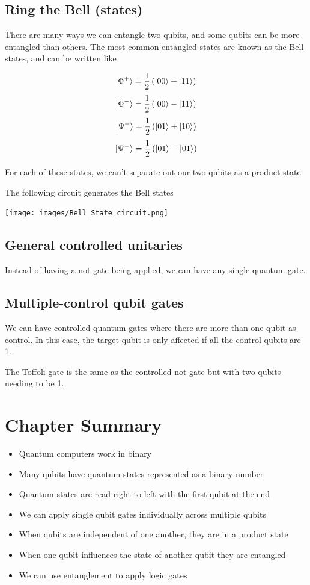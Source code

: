 \documentclass{book}
\begin{document}
\subsection{ Ring the Bell (states)}


There are many ways we can entangle two qubits, and some qubits can be more entangled than others. The most common entangled states are known as the Bell states, and can be written like

$$ \ket{\Phi^+} = \frac{1}{2} \left( \ket{00} + \ket{11} \right) $$
$$ \ket{\Phi^-} = \frac{1}{2} \left( \ket{00} - \ket{11} \right) $$
$$ \ket{\Psi^+} = \frac{1}{2} \left( \ket{01} + \ket{10} \right) $$
$$ \ket{\Psi^-} = \frac{1}{2} \left( \ket{01} - \ket{01} \right) $$

For each of these states, we can't separate out our two qubits as a product state. 


The following circuit generates the Bell states

\texttt{[image: images/Bell\_State\_circuit.png]}


\subsection{General controlled unitaries }

Instead of having a not-gate being applied, we can have any single quantum gate.

\subsection{Multiple-control qubit gates }

We can have controlled quantum gates where there are more than one qubit as control. In this case, the target qubit is only affected if all the control qubits are 1. 

The Toffoli gate is the same as the controlled-not gate but with two qubits needing to be 1.

\section{Chapter Summary}

\begin{itemize}
    \item Quantum computers work in binary
    \item Many qubits have quantum states represented as a binary number
    \item Quantum states are read right-to-left with the first qubit at the end
    \item We can apply single qubit gates individually across multiple qubits 
    \item When qubits are independent of one another, they are in a product state
    \item When one qubit influences the state of another qubit they are entangled 
    \item We can use entanglement to apply logic gates
\end{itemize}
\end{document}
